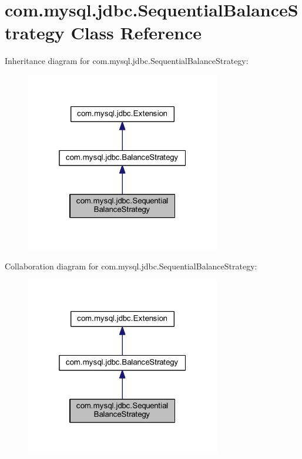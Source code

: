\hypertarget{classcom_1_1mysql_1_1jdbc_1_1_sequential_balance_strategy}{}\section{com.\+mysql.\+jdbc.\+Sequential\+Balance\+Strategy Class Reference}
\label{classcom_1_1mysql_1_1jdbc_1_1_sequential_balance_strategy}


Inheritance diagram for com.\+mysql.\+jdbc.\+Sequential\+Balance\+Strategy\+:
\nopagebreak
\begin{figure}[H]
\begin{center}
\leavevmode
\includegraphics[width=241pt]{classcom_1_1mysql_1_1jdbc_1_1_sequential_balance_strategy__inherit__graph}
\end{center}
\end{figure}


Collaboration diagram for com.\+mysql.\+jdbc.\+Sequential\+Balance\+Strategy\+:
\nopagebreak
\begin{figure}[H]
\begin{center}
\leavevmode
\includegraphics[width=241pt]{classcom_1_1mysql_1_1jdbc_1_1_sequential_balance_strategy__coll__graph}
\end{center}
\end{figure}

